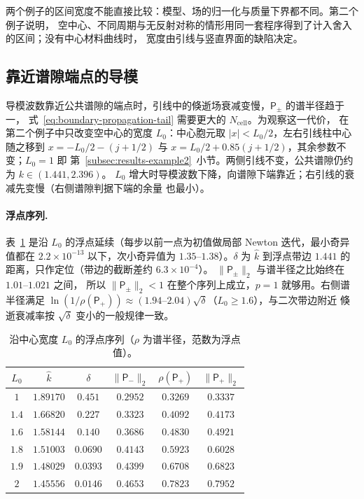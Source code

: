 两个例子的区间宽度不能直接比较：模型、场的归一化与质量下界都不同。第二个例子说明，
空中心、不同周期与无反射对称的情形用同一套程序得到了计入舍入的区间；没有中心材料曲线时，
宽度由引线与竖直界面的缺陷决定。

\subsection{靠近谱隙端点的导模}
\label{subsec:results-gapedge}

导模波数靠近公共谱隙的端点时，引线中的倏逝场衰减变慢，$\mathsf P_\pm$ 的谱半径趋于一，
式~\eqref{eq:boundary-propagation-tail} 需要更大的 $N_{\mathrm{cell}}$。为观察这一代价，
在第二个例子中只改变空中心的宽度 $L_0$：中心胞元取 $|x|<L_0/2$，左右引线柱中心随之移到
$x=-L_0/2-(j+1/2)$ 与 $x=L_0/2+0.85(j+1/2)$，其余参数不变；$L_0=1$ 即
第~\ref{subsec:results-example2}~小节。两侧引线不变，公共谱隙仍约为 $k\in(1.441,2.396)$。
$L_0$ 增大时导模波数下降，向谱隙下端靠近；右引线的衰减先变慢（右侧谱隙判据下端的余量
也最小）。

\paragraph{浮点序列.}
表~\ref{tab:results-gapedge-float} 是沿 $L_0$ 的浮点延续（每步以前一点为初值做局部
Newton 迭代，最小奇异值都在 $2.2\times10^{-13}$ 以下，次小奇异值为 $1.35$--$1.38$）。$\delta$ 为
$\widehat k$ 到浮点带边 $1.441$ 的距离，只作定位（带边的截断差约 $6.3\times10^{-4}$）。
$\lVert\mathsf P_\pm\rVert_2$ 与谱半径之比始终在 $1.01$--$1.021$ 之间，
所以 $\lVert\mathsf P_\pm\rVert_2<1$ 在整个序列上成立，$p=1$ 就够用。右侧谱半径满足
$\ln(1/\rho(\mathsf P_+))\approx(1.94\text{--}2.04)\sqrt\delta$（$L_0\ge1.6$），与二次带边附近
倏逝衰减率按 $\sqrt\delta$ 变小的一般规律一致。
\begin{table}[htbp]
  \centering
  \caption{沿中心宽度 $L_0$ 的浮点序列（$\rho$ 为谱半径，范数为浮点值）。}
  \label{tab:results-gapedge-float}
  \begin{tabular}{cccccc}
    \toprule
    $L_0$ & $\widehat k$ & $\delta$ & $\lVert\mathsf P_-\rVert_2$ & $\rho(\mathsf P_+)$ & $\lVert\mathsf P_+\rVert_2$\\
    \midrule
    $1$   & $1.89170$ & $0.451$  & $0.2952$ & $0.3269$ & $0.3337$\\
    $1.4$ & $1.66820$ & $0.227$  & $0.3323$ & $0.4092$ & $0.4173$\\
    $1.6$ & $1.58144$ & $0.140$  & $0.3686$ & $0.4830$ & $0.4921$\\
    $1.8$ & $1.51003$ & $0.0690$ & $0.4143$ & $0.5923$ & $0.6028$\\
    $1.9$ & $1.48029$ & $0.0393$ & $0.4399$ & $0.6708$ & $0.6823$\\
    $2$   & $1.45556$ & $0.0146$ & $0.4653$ & $0.7823$ & $0.7952$\\
    \bottomrule
  \end{tabular}
\end{table}

